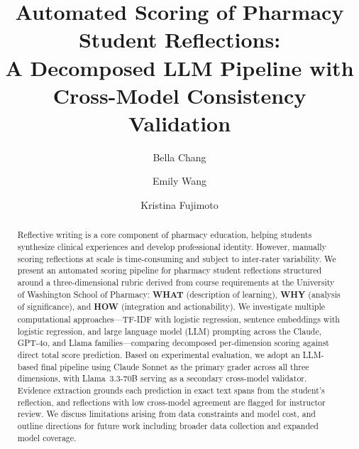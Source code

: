 \documentclass[11pt]{article}
\title{\textbf{Automated Scoring of Pharmacy Student Reflections:\\
A Decomposed LLM Pipeline with Cross-Model Consistency Validation}}
\author{
    Bella Chang \and Emily Wang \and Kristina Fujimoto\\[0.5em]
}
\date{}
\begin{document}
\maketitle

\begin{abstract}
Reflective writing is a core component of pharmacy education, helping students synthesize clinical experiences and develop professional identity. However, manually scoring reflections at scale is time-consuming and subject to inter-rater variability. We present an automated scoring pipeline for pharmacy student reflections structured around a three-dimensional rubric derived from course requirements at the University of Washington School of Pharmacy: \textbf{WHAT} (description of learning), \textbf{WHY} (analysis of significance), and \textbf{HOW} (integration and actionability). We investigate multiple computational approaches—TF-IDF with logistic regression, sentence embeddings with logistic regression, and large language model (LLM) prompting across the Claude, GPT-4o, and Llama families—comparing decomposed per-dimension scoring against direct total score prediction. Based on experimental evaluation, we adopt an LLM-based final pipeline using Claude Sonnet as the primary grader across all three dimensions, with Llama~3.3-70B serving as a secondary cross-model validator. Evidence extraction grounds each prediction in exact text spans from the student's reflection, and reflections with low cross-model agreement are flagged for instructor review. We discuss limitations arising from data constraints and model cost, and outline directions for future work including broader data collection and expanded model coverage.
\end{abstract}
\end{document}
